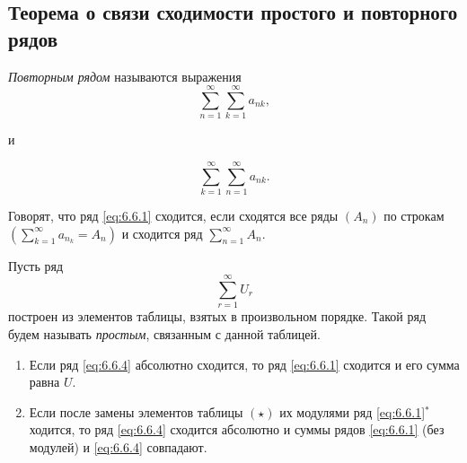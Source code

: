 \subsection{Теорема о связи сходимости простого и повторного рядов}

\begin{definition}
    \emph{Повторным рядом} называются выражения
    \begin{equation}\label{eq:6.6.1}
        \sum_{n=1}^{\infty}\sum_{k=1}^{\infty}a_{nk},
    \end{equation}
    \begin{center}
        и
    \end{center}
    \begin{equation}\label{eq:6.6.2}
        \sum_{k=1}^{\infty}\sum_{n=1}^{\infty}a_{nk}.
    \end{equation}

    Говорят, что ряд \ref{eq:6.6.1} сходится, если сходятся все ряды $(A_n)$ по строкам $(\sum_{k=1}^{\infty}a_{n_k} = A_n)$ и сходится ряд $ \sum_{n=1}^{\infty}A_n $.
\end{definition}

\begin{definition}
    Пусть ряд
    \begin{equation}\label{eq:6.6.4}
        \sum_{r=1}^{\infty}U_r
    \end{equation}
    построен из элементов таблицы, взятых в произвольном порядке. Такой ряд будем называть \emph{простым}, связанным с данной таблицей.
\end{definition}

\begin{theorem}\leavevmode
    \begin{enumerate}
        \item Если ряд \ref{eq:6.6.4} абсолютно сходится, то ряд \ref{eq:6.6.1} сходится и его сумма равна $U$.

        \item Если после замены элементов таблицы $(\star)$ их модулями ряд \ref{eq:6.6.1}$ ^* $ ходится, то ряд \ref{eq:6.6.4} сходится абсолютно и суммы рядов \ref{eq:6.6.1} (без модулей) и \ref{eq:6.6.4} совпадают.
    \end{enumerate}
\end{theorem}

